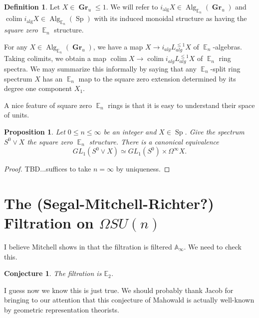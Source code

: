 \documentclass[reqno, oneside]{amsart}
\theoremstyle{definition}
\newtheorem{dfn}[nul]{Definition}
\theoremstyle{plain}
\newtheorem{prop}[nul]{Proposition}
\newtheorem{cnj}[nul]{Conjecture}
\DeclareMathOperator*{\colim}{\text{colim}}
\DeclareMathOperator{\E}{\mathbb{E}}
\DeclareMathOperator{\Gr}{\textbf{Gr}}
\DeclareMathOperator{\Alg}{\text{Alg}}
\DeclareMathOperator{\Sp}{\text{Sp}}
\begin{document}
\begin{dfn}
Let $X\in \Gr_u{\leq 1}$.  We will refer to $i_{\text{alg}}X\in \Alg_{\E_n}(\Gr_u)$ and $\colim i_{\text{alg}}X\in \Alg_{\E_n}(\Sp)$ with its induced monoidal structure as having the \emph{square zero} $\E_n$ structure.
\end{dfn}

For any $X\in \Alg_{\E_n}(\Gr_u)$, we have a map $X\to i_{alg}L^{\leq 1}_{alg}X$ of $\E_n$-algebras.  Taking colimits, we obtain a map $\colim X \to \colim i_{alg}L^{\leq 1}_{alg}X$ of $\E_n$ ring spectra.
 We may summarize this informally by saying that any $\E_n$-split ring spectrum $X$ has an $\E_n$ map to the square zero extension determined by its degree one component $X_1$.  

A nice feature of square zero $\E_n$ rings is that it is easy to understand their space of units.  

\begin{prop}
Let $0\leq n\leq \infty$ be an integer and $X\in \Sp$.  Give the spectrum $S^0\vee X$ the square zero $\E_n$ structure.  There is a canonical equivalence $$GL_1(S^0\vee X) \simeq GL_1(S^0) \times \Omega^{\infty} X.$$
\end{prop}
\begin{proof}
TBD...suffices to take $n=\infty$ by uniqueness.  
\end{proof}


\section{The (Segal-Mitchell-Richter?) Filtration on \texorpdfstring{$\Omega SU(n)$}{Loops SU(n)}}

I believe Mitchell shows in \cite{MitchellSU(n)} that the filtration is filtered $\mathbb{A}_\infty$.  We need to check this.

\begin{cnj} The filtration is $\mathbb{E}_2$.
\end{cnj}
I guess now we know this is just true.  We should probably thank Jacob for bringing to our attention that this conjecture of Mahowald is actually well-known by geometric representation theorists.  
\end{document}
